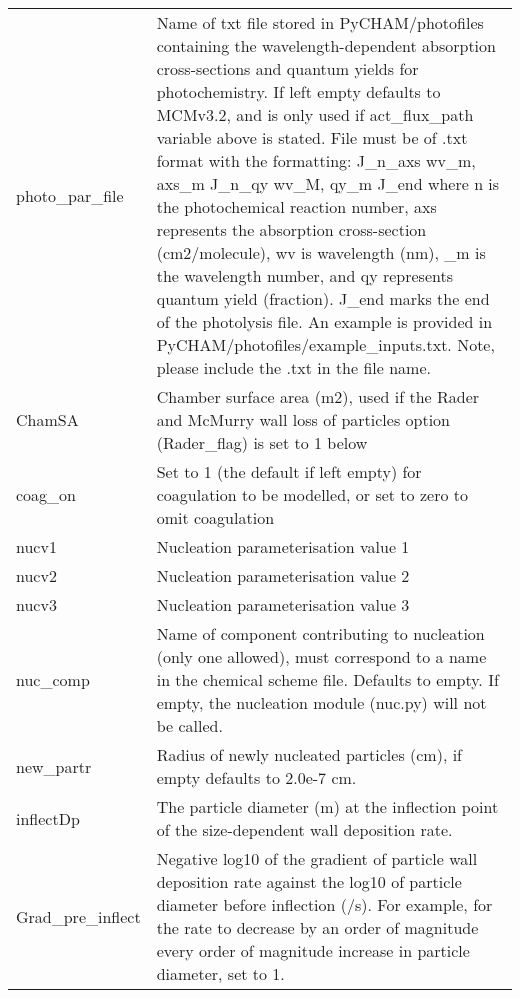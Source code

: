 \documentclass[gmd, manuscript]{copernicus}
\begin{document}
\begin{center}
\begin{supertabular}{p{0.15\textwidth}p{0.75\textwidth}}
photo\_par\_file & Name of txt file stored in PyCHAM/photofiles containing the wavelength-dependent absorption cross-sections and quantum yields for photochemistry.  If left empty defaults to MCMv3.2, and is only used if act\_flux\_path variable above is stated.  File must be of .txt format with the formatting: \newline J\_n\_axs \newline wv\_m, axs\_m \newline J\_n\_qy \newline wv\_M, qy\_m \newline J\_end \newline where n is the photochemical reaction number, axs represents the absorption cross-section (cm2/molecule), wv is wavelength (nm), \_m is the wavelength number, and qy represents quantum yield (fraction).  J\_end marks the end of the photolysis file.  An example is provided in PyCHAM/photofiles/example\_inputs.txt.  Note, please include the .txt in the file name.\\

ChamSA & Chamber surface area (m2), used if the Rader and McMurry wall loss of particles option (Rader\_flag) is set to 1 below\\

coag\_on & Set to 1 (the default if left empty) for coagulation to be modelled, or set to zero to omit coagulation\\

nucv1 & Nucleation parameterisation value 1\\

nucv2 & Nucleation parameterisation value 2\\

nucv3 & Nucleation parameterisation value 3\\

nuc\_comp & Name of component contributing to nucleation (only one allowed), must correspond to a name in the chemical scheme file.  Defaults to empty.  If empty, the nucleation module (nuc.py) will not be called.\\

new\_partr & Radius of newly nucleated particles (cm), if empty defaults to 2.0e-7 cm.\\

inflectDp & The particle diameter (m) at the inflection point of the size-dependent wall deposition rate.\\

Grad\_pre\_inflect & Negative log10 of the gradient of particle wall deposition rate against the log10 of particle diameter before inflection (/s).  For example, for the rate to decrease by an order of magnitude every order of magnitude increase in particle diameter, set to 1.\\


\end{supertabular}
\end{center}
\end{document}
